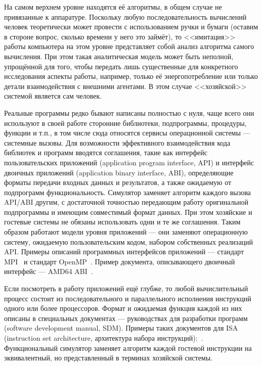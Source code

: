 На самом верхнем уровне находятся её алгоритмы, в общем случае не привязанные к аппаратуре. Поскольку любую последовательность вычислений человек теоретически может провести с использованием ручки и бумаги (оставим в стороне вопрос, сколько времени у него это займёт), то <<имитация>> работы компьютера на этом уровне представляет собой анализ алгоритма самого вычисления. При этом такая аналитическая модель может быть неполной, упрощённой для того, чтобы передать лишь существенные для конкретного исследования аспекты работы, например, только её энергопотребление или только детали взаимодействия с внешними агентами. В этом случае <<хозяйской>> системой является сам человек.

Реальные программы редко бывают написаны полностью с нуля, чаще всего они используют в своей работе сторонние библиотеки, подпрограммы, процедуры, функции и т.п., в том числе сюда относятся сервисы операционной системы --- системные вызовы. Для возможности эффективного взаимодействия кода библиотек и программ вводятся соглашения, такие как интерфейс пользовательских приложений (\abbr application program interface, API) и интерфейс двоичных приложений (\abbr application binary interface, ABI), определяющие форматы передачи входных данных и результатов, а также ожидаемую от подпрограмм функциональность. Симулятор заменяет алгоритм каждого вызова API/ABI другим, с достаточной точностью передающим работу оригинальной подпрограммы и имеющим совместимый формат данных. При этом хозяйские и гостевые системы не обязаны использовать одни и те же соглашения. Таким образом работают модели уровня приложений --- они заменяют операционную систему, ожидаемую пользовательским кодом, набором собственных реализаций API. Примеры описаний программных интерфейсов приложений --- стандарт MPI~\cite{mpi2std} и стандарт OpenMP~\cite{openmp}. Пример документа, описывающего двоичный интерфейс --- AMD64 ABI~\cite{x86-64-abi}.

Если посмотреть в работу приложений ещё глубже, то любой вычислительный процесс состоит из последовательного и параллельного исполнения инструкций одного или более процессоров. Формат и ожидаемая функция каждой из них описаны в специальных документах --- руководствах для разработки программ (\abbr software development manual, SDM). Примеры таких документов для ISA (\abbr instruction set architecture, архитектура набора инструкций):~\cite{intelmanual-7vols, amd-sdm-vol1, weaver1994sparc, arm-sdg, alpha-book}. Функциональный симулятор заменяет алгоритм каждой гостевой инструкции на эквивалентный, но представленный в терминах хозяйской системы.

